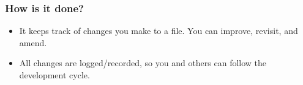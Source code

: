 \documentclass[14pt,compress]{beamer}
\begin{document}
\begin{frame}
  \frametitle{How is it done?}
  \begin{itemize}
  \item It keeps track of changes you make to a file. You can improve, revisit, and amend.
  \item All changes are logged/recorded, so you and others can follow the development cycle.
  \end{itemize}  
\end{frame}





\end{document}
